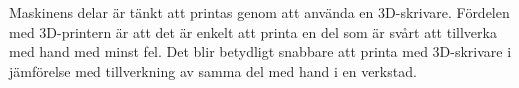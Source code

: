 Maskinens delar är tänkt att printas genom att använda en 3D-skrivare. Fördelen med 3D-printern är att det är enkelt att printa en del som är svårt att tillverka med hand med minst fel. Det blir betydligt snabbare att printa med 3D-skrivare i jämförelse med tillverkning av samma del med hand i en verkstad. 